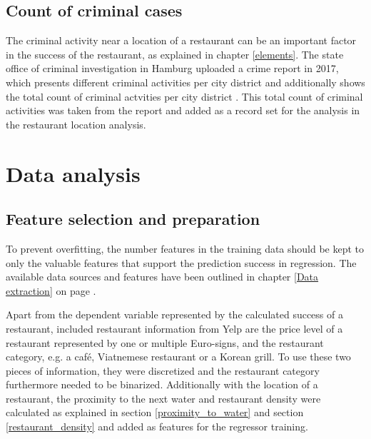 \documentclass[a4paper, 11pt, oneside]{Thesis}  %
\begin{document}
\section{Count of criminal cases}
\label{criminal_count}

The criminal activity near a location of a restaurant can be an important factor in the success of the restaurant, as explained in chapter \ref{elements}. The state office of criminal investigation in Hamburg uploaded a crime report in 2017, which presents different criminal activities per city district and additionally shows the total count of criminal actvities per city district \cite{LandeskriminalamtHamburg.2017}. This total count of criminal activities was taken from the report and added as a record set for the analysis in the restaurant location analysis.

\chapter{Data analysis}
\label{data_analysis}

\section{Feature selection and preparation}
\label{sec:Feature_selection}

To prevent overfitting, the number features in the training data should be kept to only the valuable features that support the prediction success in regression. The available data sources and features have been outlined in chapter \ref{Data extraction} on page \pageref{Data extraction}. 

Apart from the dependent variable represented by the calculated success of a restaurant, included restaurant information from Yelp are the price level of a restaurant represented by one or multiple Euro-signs, and the restaurant category, e.g. a café, Viatnemese restaurant or a Korean grill. To use these two pieces of information, they were discretized and the restaurant category furthermore needed to be binarized. Additionally with the location of a restaurant, the proximity to the next water and restaurant density were calculated as explained in section \ref{proximity_to_water} and section \ref{restaurant_density} and added as features for the regressor training.
\end{document}
